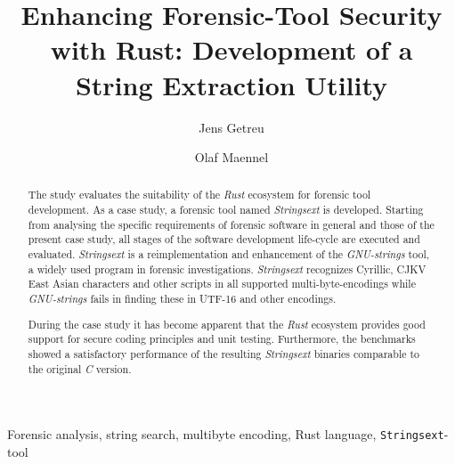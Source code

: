 \documentclass[final,5p,times,twocolumn]{elsarticle}
\begin{document}
\begin{frontmatter}

\title{Enhancing Forensic-Tool Security with Rust: Development of a String Extraction Utility}






\author{Jens Getreu}
\author{Olaf Maennel}
\address{Tallinn University of Technology, Ehitajate tee 5, 19086 Tallinn,
Estonia} 

\begin{abstract}
The study evaluates the suitability of the \emph{Rust} ecosystem
for forensic tool development.  As a case study, a forensic tool
named \emph{Strings­ext}\cite{getreu2017a}\cite{getreu2017} is developed. 
Starting from analysing the specific requirements of forensic software
in general and those of the present case study, all stages of the software
development life-cycle are executed and evaluated.
\emph{Strings­ext} is a reimplementation and enhancement of the
\emph{GNU-strings} tool, a widely used program in forensic investigations.
\emph{Strings­ext} recognizes Cyrillic, CJKV East Asian characters and other
scripts in all supported multi-byte-encodings while \emph{GNU-strings} fails in
finding these in UTF-16 and other encodings.

During the case study it has become apparent that the \emph{Rust}
ecosystem provides good support for secure coding principles and unit
testing. Furthermore, the benchmarks showed a satisfactory performance
of the resulting \emph{Strings­ext} binaries comparable to the original
\emph{C} version.
\end{abstract}


\begin{keyword}

Forensic analysis, string search, multibyte encoding, Rust
language, \texttt{Stringsext}-tool

\end{keyword}

\end{frontmatter}
\end{document}
